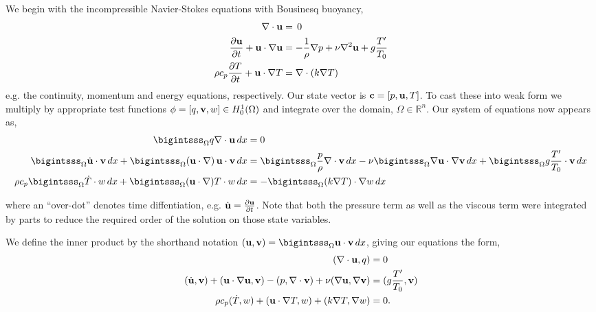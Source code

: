 We begin with the incompressible Navier-Stokes equations with Bousinesq
buoyancy,
\begin{align}
 \nabla \cdot {\bf u} &= \, 0 \label{eq_cont}\\
 \frac{\partial {\bf u}}{\partial t} + {\bf u} \cdot \nabla {\bf u} &= -\frac{1}{\rho}
 \nabla p + \nu \nabla^2 {\bf u} + g \frac{T'}{T_0} \label{eq_mom}\\
 \rho c_p \frac{\partial T}{\partial t} + {\bf u} \cdot \nabla T &= \nabla
 \cdot (k \nabla T) \label{eq_energy}
\end{align}
e.g. the continuity, momentum and energy equations, respectively. Our 
state vector is ${\bf c} =  \left[p,{\bf u},T \right]$. To cast these into
weak form we multiply by appropriate test 
functions ${\bf \phi} = \left[q,{\bf v},w \right] \in H^1_0(\Omega)$ and
integrate over the domain, $\Omega \in \mathbb{R}^n$. Our system of
equations now appears as, 
\begin{align}
  \bigintsss_\Omega q \nabla \cdot {\bf u} \, dx &= 0 \\
 \bigintsss_\Omega \dot {\bf u} \cdot {\bf v} \, dx +
 \bigintsss_\Omega  ({\bf u} \cdot \nabla) \, {\bf u} \cdot {\bf v} \, dx &=
 \bigintsss_\Omega \frac{p}{\rho} \nabla \cdot {\bf v} \, dx - \nu \bigintsss_\Omega \nabla {\bf u} \cdot \nabla {\bf v}
 \,dx + \bigintsss_\Omega g \frac{T'}{T_0} \cdot {\bf v} \, dx \\ 
 \rho c_p \bigintsss_\Omega \dot T \cdot w \, dx + \bigintsss_\Omega ({\bf u}
 \cdot \nabla) T \cdot w \, dx  &= -\bigintsss_\Omega (k \nabla T) \cdot
 \nabla w \, dx
\end{align}

where an ``over-dot'' denotes time diffentiation, e.g. $\dot {\bf u} =
\frac{\partial {\bf u}}{\partial t}$. Note that both the pressure term as well
as the viscous term were integrated by parts to reduce the required
order of the solution on those state variables.  

We define the inner product by the shorthand notation $({\bf u},{\bf v}) =
\bigintsss_\Omega {\bf u}\cdot {\bf v}\, dx $, giving our equations the form,  
\begin{align}
 (\nabla \cdot {\bf u}, q) &= 0 \\
 (\dot {\bf u},{\bf v}) + ({\bf u} \cdot \nabla {\bf u}, {\bf v}) - (p,\nabla \cdot {\bf v}) + \nu (\nabla
 {\bf u}, \nabla {\bf v}) &= (g \frac{T'}{T_0},{\bf v}) \\
 \rho c_p (\dot T,w) + ({\bf u} \cdot \nabla T,w) + (k \nabla T,\nabla w) &= 0.
\end{align}


